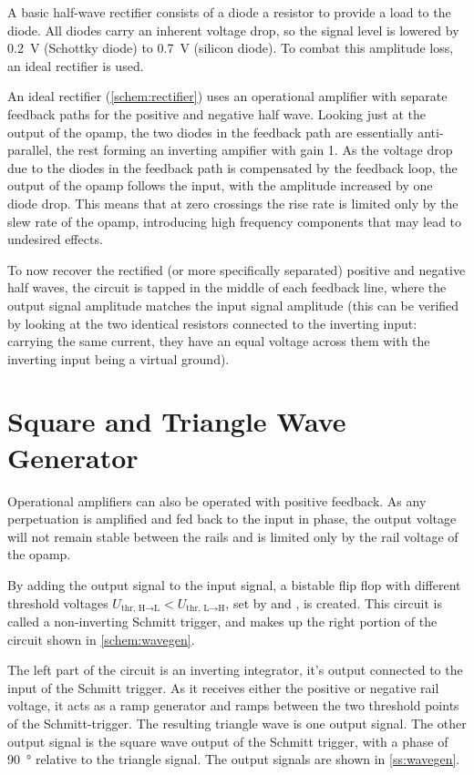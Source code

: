 A basic half-wave rectifier consists of a diode a resistor to provide a load to the diode.
All diodes carry an inherent voltage drop, so the signal level is lowered by \SI{0.2}{\volt} (Schottky diode) to \SI{0.7}{\volt} (silicon diode).
To combat this amplitude loss, an ideal rectifier is used.

An ideal rectifier (\autoref{schem:rectifier}) uses an operational amplifier with separate feedback paths for the positive and negative half wave.
Looking just at the output of the opamp, the two diodes in the feedback path are essentially anti-parallel, the rest forming an inverting ampifier with gain 1.
As the voltage drop due to the diodes in the feedback path is compensated by the feedback loop, the output of the opamp follows the input, with the amplitude increased by one diode drop.
This means that at zero crossings the rise rate is limited only by the slew rate of the opamp, introducing high frequency components that may lead to undesired effects.

To now recover the rectified (or more specifically separated) positive and negative half waves, the circuit is tapped in the middle of each feedback line, where the output signal amplitude matches the input signal amplitude (this can be verified by looking at the two identical resistors connected to the inverting input: carrying the same current, they have an equal voltage across them with the inverting input being a virtual ground).

\section{Square and Triangle Wave Generator}

Operational amplifiers can also be operated with positive feedback.
As any perpetuation is amplified and fed back to the input in phase, the output voltage will not remain stable between the rails and is limited only by the rail voltage of the opamp.

By adding the output signal to the input signal, a bistable flip flop with different threshold voltages $U_{\text{thr, H} \rightarrow \text{L}} < U_{\text{thr, L} \rightarrow \text{H}}$, set by  and , is created.
This circuit is called a non-inverting Schmitt trigger, and makes up the right portion of the circuit shown in \autoref{schem:wavegen}.

The left part of the circuit is an inverting integrator, it's output connected to the input of the Schmitt trigger.
As it receives either the positive or negative rail voltage, it acts as a ramp generator and ramps between the two threshold points of the Schmitt-trigger.
The resulting triangle wave is one output signal.
The other output signal is the square wave output of the Schmitt trigger, with a phase of \SI{90}{\degree} relative to the triangle signal.
The output signals are shown in \autoref{ss:wavegen}.


